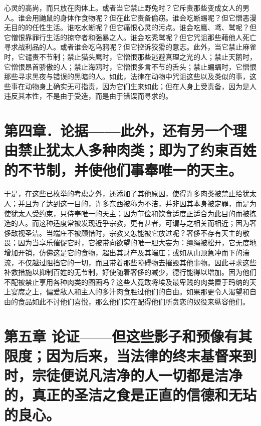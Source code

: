心灵的高尚，而只放在肉体上。或者当它禁止野兔时？它斥责那些变成女人的男人。谁会用鼬鼠的身体作食物呢？但在此它责备偷窃。谁会吃蜥蜴呢？但它憎恶漫无目的的任性生活。谁吃水蜥呢？但它痛恨心灵的污点。谁会吃鹰、鸢、鹫呢？但它憎恨靠罪行生活的掠夺者和强暴之人。谁会吃秃鹫呢？但它咒诅那些藉他人死亡寻求战利品的人。或者谁会吃乌鸦呢？但它控诉狡猾的意志。此外，当它禁止麻雀时，它谴责不节制；禁止猫头鹰时，它憎恨那些逃避真理之光的人；禁止天鹅时，它憎恨昂首骄傲的人；禁止海鸥时，它憎恨多言不节的舌头；禁止蝙蝠时，它憎恨那些寻求黑夜与错误的黑暗的人。如此，法律在动物中咒诅这些以及类似的事，这些事在动物身上确实无可指责，因为它们生来如此；但在人身上受责备，因为是人违反其本性，不是由于受造，而是由于错误而寻求的。\par


\section{第四章．论据——此外，还有另一个理由禁止犹太人多种肉类；即为了约束百姓的不节制，并使他们事奉唯一的天主。}

于是，在这些已枚举的考虑之外，还添加了其他原因，使得许多肉类被禁止给犹太人；并且为了达到这一目的，许多东西被称为不洁，并非因其本身被定罪，而是为使犹太人受约束，只侍奉唯一的天主；因为节俭和饮食适度正适合为此目的而被拣选的人。而这种适度常被发现近乎宗教，更有甚者，可谓与之相关而相近；因为奢侈敌视圣洁。当端庄不被顾惜时，宗教又怎能被它放过呢？奢侈不存有天主的敬畏；因为当享乐催促它时，它被带向欲望的唯一胆大妄为：缰绳被松开，它无度地增加开销，仿佛这是它的食物，超出其财产及其端庄；或如从山顶急冲而下的湍流，不仅越过阻挡它的一切，而且带着那些障碍物去摧毁其他事物。因此寻求这些补救措施以抑制百姓的无节制，好使随着奢侈的减少，德行能得以增加。因为他们不配被禁止享用各种肉类的图画吗？这些人竟敢将埃及最卑贱的肉类置于玛纳的天上宴席之上，偏爱敌人和主人的多汁肉食胜过他们的自由。如果那更令人渴望和自由的食品如此不讨他们喜悦，那么他们实在配得他们所贪恋的奴役来纵容他们。\par


\section{第五章 论证——但这些影子和预像有其限度；因为后来，当法律的终末基督来到时，宗徒便说凡洁净的人一切都是洁净的，真正的圣洁之食是正直的信德和无玷的良心。}

